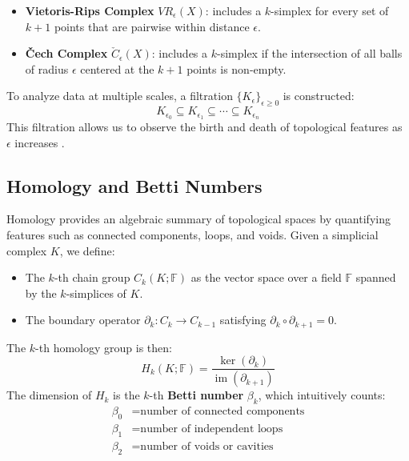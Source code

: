 \documentclass[9pt, twoside, twocolumn]{extarticle}
\begin{document}
        \begin{itemize}
        \item \textbf{Vietoris-Rips Complex} $VR_\epsilon(X)$: includes a $k$-simplex for every set of $k+1$ points that are pairwise within distance $\epsilon$.
        \item \textbf{\v{C}ech Complex} $\check{C}_\epsilon(X)$: includes a $k$-simplex if the intersection of all balls of radius $\epsilon$ centered at the $k+1$ points is non-empty.
        \end{itemize}

        To analyze data at multiple scales, a filtration $\{K_\epsilon\}_{\epsilon \geq 0}$ is constructed:
        \[
        K_{\epsilon_0} \subseteq K_{\epsilon_1} \subseteq \cdots \subseteq K_{\epsilon_n}
        \]
        This filtration allows us to observe the birth and death of topological features as $\epsilon$ increases \cite{edelsbrunner2000topological}.

    \subsection*{Homology and Betti Numbers}

        Homology provides an algebraic summary of topological spaces by quantifying features such as connected components, loops, and voids. Given a simplicial complex $K$, we define:

        \begin{itemize}
            \item The $k$-th chain group $C_k(K; \mathbb{F})$ as the vector space over a field $\mathbb{F}$ spanned by the $k$-simplices of $K$.
            \item The boundary operator $\partial_k : C_k \to C_{k-1}$ satisfying $\partial_{k} \circ \partial_{k+1} = 0$.
        \end{itemize}

        The $k$-th homology group is then:
        \[
        H_k(K; \mathbb{F}) = \frac{\ker(\partial_k)}{\operatorname{im}(\partial_{k+1})}
        \]
        The dimension of $H_k$ is the $k$-th \textbf{Betti number} $\beta_k$, which intuitively counts:
        \begin{align*}
        \beta_0 &= \text{number of connected components} \\
        \beta_1 &= \text{number of independent loops} \\
        \beta_2 &= \text{number of voids or cavities}
        \end{align*}
\end{document}
